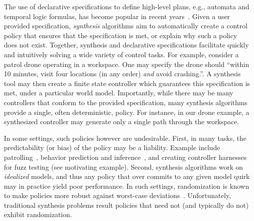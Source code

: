 The use of declarative specifications to define high-level plans, e.g.,
automata and temporal logic formulas, has become popular in recent
years~\cite{DBLP:conf/iros/HorowitzWM14, DBLP:conf/rss/WongEK14, DBLP:conf/iros/HeLKV17, DBLP:conf/icra/FuATP16, DBLP:conf/icra/HeWKV19, DBLP:journals/arobots/MoarrefK20, DBLP:conf/icra/KantarosM0P20}.
Given a user provided specification, \emph{synthesis} algorithms aim
to automatically create a control policy that ensures that the
specification is met, or explain why such a policy does not
exist. Together, synthesis and declarative specifications facilitate
quickly and intuitively solving a wide variety of control tasks.  For
example, consider a patrol drone operating in a workspace. One may
specify the drone should ``within 10 minutes, visit four locations (in any
order) \emph{and} avoid crashing.''. A synthesis tool may then create a
finite state controller which guarantees this specification is met,
under a particular world model.
Importantly, while there may be many controllers that conform to the
provided specification, many synthesis algorithms provide a
single, often deterministic, policy.  For instance, in our drone
example, a synthesized controller may generate only a single path
through the workspace.

In some settings, such policies however are undesirable.  First, in
many tasks, the predictability (or bias) of the policy may be a
liability.  Example include
patrolling~\cite{DBLP:journals/ior/AlpernMP11}, behavior prediction
and inference~\cite{DBLP:conf/cav/Vazquez-Chanlatte20}, and creating
controller harnesses for fuzz testing (see motivating
example). Second, synthesis algorithms work on \emph{idealized}
models, and thus any policy that over commits to any given model quirk
may in practice yield poor performance. In such settings,
randomization is known to make policies more robust against worst-case
deviations~\cite{mceThesis, maxEntAnswer}. Unfortunately, traditional
synthesis problems result policies that need not (and typically do
not) exhibit randomization.


